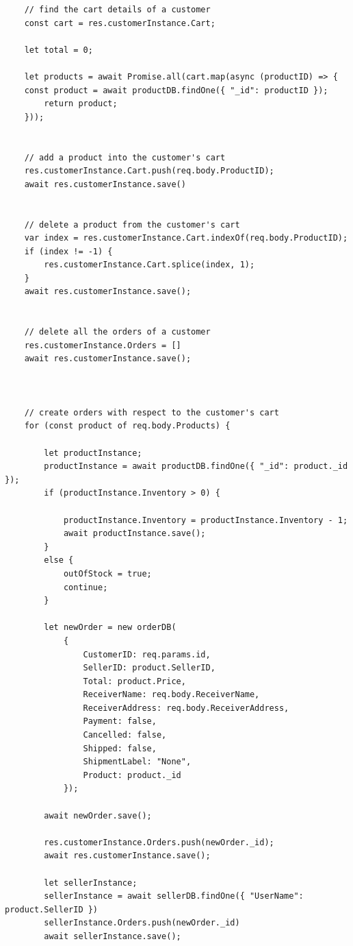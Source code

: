 \documentclass[12pt]{article}
\begin{document}
\begin{verbatim}
    // find the cart details of a customer
    const cart = res.customerInstance.Cart;

    let total = 0;

    let products = await Promise.all(cart.map(async (productID) => {
    const product = await productDB.findOne({ "_id": productID });
        return product;
    }));


    // add a product into the customer's cart
    res.customerInstance.Cart.push(req.body.ProductID);
    await res.customerInstance.save()


    // delete a product from the customer's cart 
    var index = res.customerInstance.Cart.indexOf(req.body.ProductID);
    if (index != -1) {
        res.customerInstance.Cart.splice(index, 1);
    }
    await res.customerInstance.save();


    // delete all the orders of a customer 
    res.customerInstance.Orders = []
    await res.customerInstance.save();



    // create orders with respect to the customer's cart 
    for (const product of req.body.Products) {

        let productInstance;
        productInstance = await productDB.findOne({ "_id": product._id });
        if (productInstance.Inventory > 0) {

            productInstance.Inventory = productInstance.Inventory - 1;
            await productInstance.save();
        }
        else {
            outOfStock = true;
            continue;
        }

        let newOrder = new orderDB(
            {
                CustomerID: req.params.id,
                SellerID: product.SellerID,
                Total: product.Price,
                ReceiverName: req.body.ReceiverName,
                ReceiverAddress: req.body.ReceiverAddress,
                Payment: false,
                Cancelled: false,
                Shipped: false,
                ShipmentLabel: "None",
                Product: product._id
            });

        await newOrder.save();

        res.customerInstance.Orders.push(newOrder._id);
        await res.customerInstance.save();

        let sellerInstance;
        sellerInstance = await sellerDB.findOne({ "UserName": product.SellerID })
        sellerInstance.Orders.push(newOrder._id)
        await sellerInstance.save();


\end{verbatim}
\end{document}
